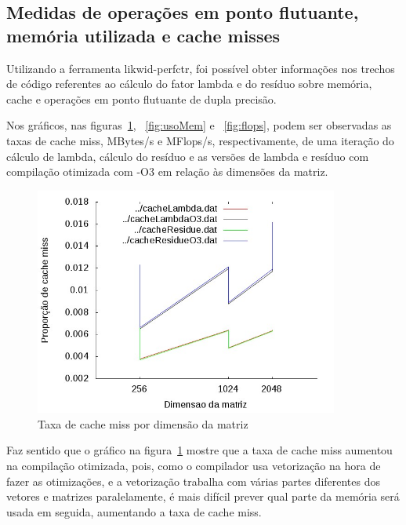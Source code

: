 \documentclass[12pt]{article}
\begin{document}
\subsection{Medidas de operações em ponto flutuante, memória utilizada e cache
misses}\label{sec:FlopsMemCache}

Utilizando a ferramenta likwid-perfctr, foi possível obter informações nos
trechos de código referentes ao cálculo do fator lambda e do resíduo sobre
memória, cache e operações em ponto flutuante de dupla precisão.

Nos gráficos, nas figuras~\ref{fig:cacheMiss}, ~\ref{fig:usoMem} e
~\ref{fig:flops}, podem ser observadas as taxas de cache miss, MBytes/s e
MFlops/s, respectivamente, de uma iteração do cálculo de lambda, cálculo do
resíduo e as versões de lambda e resíduo com compilação otimizada com -O3 em
relação às dimensões da matriz.

\begin{figure}[htb] \begin{center}
\includegraphics[width=100mm]{img/cacheMiss.jpg} \end{center}
\caption{Taxa de cache miss por dimensão da matriz}\label{fig:cacheMiss}
\end{figure}

Faz sentido que o gráfico na figura~\ref{fig:cacheMiss} mostre que a taxa de
cache miss aumentou na compilação otimizada, pois, como o compilador usa 
vetorização na hora de fazer as otimizações, e a vetorização trabalha com várias 
partes diferentes dos vetores e matrizes paralelamente, é mais difícil prever 
qual parte da memória será usada em seguida, aumentando a taxa de cache miss.
\end{document}
